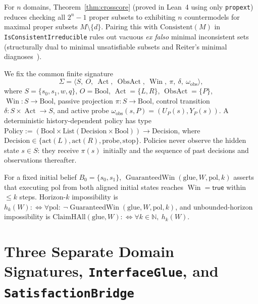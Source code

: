 \documentclass[10pt,a4paper]{article}
\theoremstyle{cleanthm}
\theoremstyle{cleandef}
\DeclareMathOperator{\Win}{Win}
\DeclareMathOperator{\Act}{Act}
\DeclareMathOperator{\ObsAct}{ObsAct}
\DeclareMathOperator{\GuaranteedWin}{GuaranteedWin}
\begin{document}
For $n$ domains, Theorem~\ref{thm:crosscore} (proved in Lean~4 using only \texttt{propext}) reduces checking all $2^n-1$ proper subsets to exhibiting $n$ countermodels for maximal proper subsets $M\setminus\{d\}$. Pairing this with $\mathrm{Consistent}(M)$ in \texttt{IsConsistentIrreducible} rules out vacuous \emph{ex falso} minimal inconsistent sets (structurally dual to minimal unsatisfiable subsets and Reiter's minimal diagnoses~\cite{reiter1987}).

We fix the common finite signature
\begin{equation}
  \Sigma = \langle S,\ O,\ \Act,\ \ObsAct,\ \Win,\ \pi,\ \delta,\ \omega_{\mathrm{obs}} \rangle,
\end{equation}
where $S=\{s_0,s_1,w,q\}$, $O=\mathrm{Bool}$, $\Act=\{L,R\}$, $\ObsAct=\{P\}$, $\Win:S\to\mathrm{Bool}$, passive projection $\pi:S\to\mathrm{Bool}$, control transition $\delta:S\times\Act\to S$, and active probe $\omega_{\mathrm{obs}}(s,P)=(U_P(s),Y_P(s))$. A deterministic history-dependent policy has type $\mathrm{Policy}:=(\mathrm{Bool}\times\mathrm{List}(\mathrm{Decision}\times\mathrm{Bool}))\to\mathrm{Decision}$, where $\mathrm{Decision}\in\{\mathrm{act}(L),\mathrm{act}(R),\mathrm{probe},\mathrm{stop}\}$. Policies never observe the hidden state $s\in S$: they receive $\pi(s)$ initially and the sequence of past decisions and observations thereafter.

For a fixed initial belief $B_0=\{s_0,s_1\}$, $\GuaranteedWin(\mathrm{glue},W,\mathrm{pol},k)$ asserts that executing $\mathrm{pol}$ from both aligned initial states reaches $\Win=\mathsf{true}$ within $\le k$ steps. Horizon-$k$ impossibility is $h_k(W):\iff\forall\mathrm{pol}:\ \neg\GuaranteedWin(\mathrm{glue},W,\mathrm{pol},k)$, and unbounded-horizon impossibility is $\mathrm{ClaimHAll}(\mathrm{glue},W):\iff\forall k\in\mathbb{N},\ h_k(W)$.

\section{Three Separate Domain Signatures, \texorpdfstring{\texttt{InterfaceGlue}}{InterfaceGlue}, and \texorpdfstring{\texttt{Satisfaction\allowbreak Bridge}}{SatisfactionBridge}}
\end{document}
